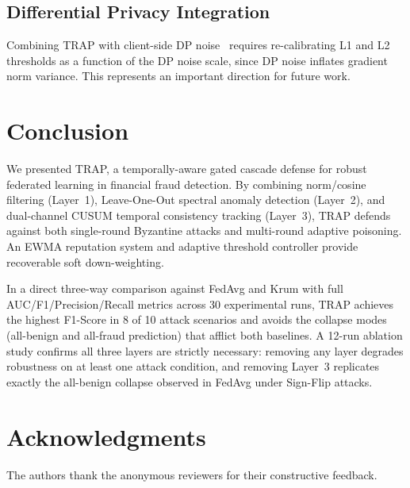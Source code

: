 \documentclass[journal]{IEEEtran}
\newcommand{\sysname}{TRAP}
\begin{document}
\subsection{Differential Privacy Integration}
Combining \sysname{} with client-side DP noise~\cite{kairouz2021advances}
requires re-calibrating L1 and L2 thresholds as a function of the DP noise
scale, since DP noise inflates gradient norm variance. This represents
an important direction for future work.

\section{Conclusion}
We presented \sysname{}, a temporally-aware gated cascade defense for
robust federated learning in financial fraud detection. By combining
norm/cosine filtering (Layer~1), Leave-One-Out spectral anomaly detection
(Layer~2), and dual-channel CUSUM temporal consistency tracking (Layer~3),
\sysname{} defends against both single-round Byzantine attacks and
multi-round adaptive poisoning. An EWMA reputation system and adaptive
threshold controller provide recoverable soft down-weighting.

In a direct three-way comparison against FedAvg and Krum with full
AUC/F1/Precision/Recall metrics across 30 experimental runs, \sysname{}
achieves the highest F1-Score in 8 of 10 attack scenarios and avoids the
collapse modes (all-benign and all-fraud prediction) that afflict both
baselines. A 12-run ablation study confirms all three layers are strictly
necessary: removing any layer degrades robustness on at least one attack
condition, and removing Layer~3 replicates exactly the all-benign collapse
observed in FedAvg under Sign-Flip attacks.

\section*{Acknowledgments}
The authors thank the anonymous reviewers for their constructive feedback.



\end{document}
